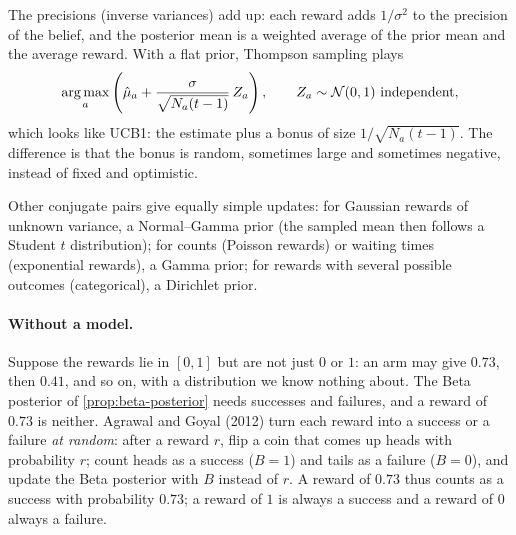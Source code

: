 The precisions (inverse variances) add up: each reward adds $1/\sigma^2$
to the precision of the belief, and the posterior mean is a weighted
average of the prior mean and the average reward. With a flat prior,
Thompson sampling plays
\begin{equation*}
  \argmax_a \left( \hat\mu_a + \frac{\sigma}{\sqrt{N_a(t-1)}}\, Z_a
  \right), \qquad Z_a \sim \mathcal{N}(0, 1)\ \text{independent},
\end{equation*}
which looks like UCB1: the estimate plus a bonus of size $1 /
\sqrt{N_a(t-1)}$. The difference is that the bonus is random, sometimes
large and sometimes negative, instead of fixed and optimistic.

Other conjugate pairs give equally simple updates: for Gaussian rewards of
unknown variance, a Normal--Gamma prior (the sampled mean then follows a
Student $t$ distribution); for counts (Poisson rewards) or waiting times
(exponential rewards), a Gamma prior; for rewards with several possible
outcomes (categorical), a Dirichlet prior.

\paragraph{Without a model.} Suppose the rewards lie in $[0, 1]$ but are
not just $0$ or $1$: an arm may give $0.73$, then $0.41$, and so on, with a
distribution we know nothing about. The Beta posterior of
\cref{prop:beta-posterior} needs successes and failures, and a reward of
$0.73$ is neither. Agrawal and Goyal (2012) turn each reward into a success
or a failure \emph{at random}: after a reward $r$, flip a coin that comes up
heads with probability $r$; count heads as a success ($B = 1$) and tails as
a failure ($B = 0$), and update the Beta posterior with $B$ instead of $r$.
A reward of $0.73$ thus counts as a success with probability $0.73$; a
reward of $1$ is always a success and a reward of $0$ always a failure.

